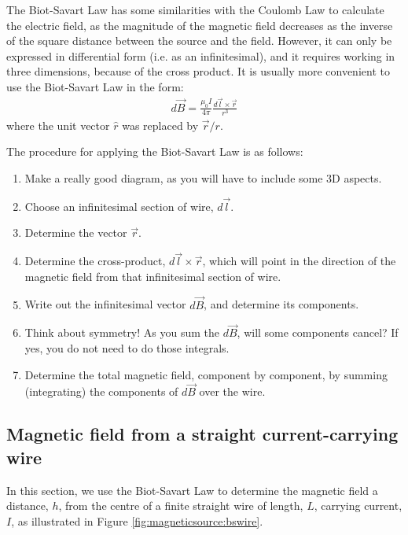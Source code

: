 The Biot-Savart Law has some similarities with the Coulomb Law to calculate the electric field, as the magnitude of the magnetic field decreases as the inverse of the square distance between the source and the field. However, it can only be expressed in differential form (i.e. as an infinitesimal), and it requires working in three dimensions, because of the cross product. It is usually more convenient to use the Biot-Savart Law in the form:
\begin{align*}
d\vec B = \frac{\mu_0 I}{4\pi}\frac{d\vec l\times \vec r}{r^3}
\end{align*}
where the unit vector $\hat r$ was replaced by $\vec r/r$.

The procedure for applying the Biot-Savart Law is as follows:
\begin{enumerate}
\item Make a really good diagram, as you will have to include some 3D aspects.
\item Choose an infinitesimal section of wire, $d\vec l$.
\item Determine the vector $\vec r$.
\item Determine the cross-product, $d\vec l \times \vec r$, which will point in the direction of the magnetic field from that infinitesimal section of wire.
\item Write out the infinitesimal vector $d\vec B$, and determine its components.
\item Think about symmetry! As you sum the $d\vec B$, will some components cancel? If yes, you do not need to do those integrals.
\item Determine the total magnetic field, component by component, by summing (integrating) the components of $d\vec B$ over the wire.
\end{enumerate}

\subsection{Magnetic field from a straight current-carrying wire}
In this section, we use the Biot-Savart Law to determine the magnetic field a distance, $h$, from the centre of a finite straight wire of length, $L$, carrying current, $I$, as illustrated in Figure \ref{fig:magneticsource:bswire}.

